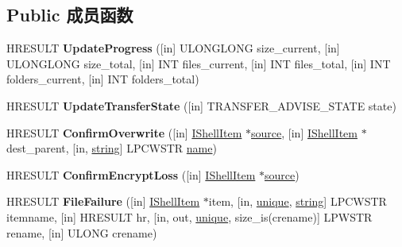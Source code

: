 \subsection*{Public 成员函数}
\begin{DoxyCompactItemize}
\item 
\mbox{\label{interface_i_transfer_advise_sink_a7b44a887f4a382c144d5557bebf167f9}} 
H\+R\+E\+S\+U\+LT {\bfseries Update\+Progress} (\mbox{[}in\mbox{]} U\+L\+O\+N\+G\+L\+O\+NG size\+\_\+current, \mbox{[}in\mbox{]} U\+L\+O\+N\+G\+L\+O\+NG size\+\_\+total, \mbox{[}in\mbox{]} I\+NT files\+\_\+current, \mbox{[}in\mbox{]} I\+NT files\+\_\+total, \mbox{[}in\mbox{]} I\+NT folders\+\_\+current, \mbox{[}in\mbox{]} I\+NT folders\+\_\+total)
\item 
\mbox{\label{interface_i_transfer_advise_sink_acbff1caea7c7a517d2904bdb88e780f1}} 
H\+R\+E\+S\+U\+LT {\bfseries Update\+Transfer\+State} (\mbox{[}in\mbox{]} T\+R\+A\+N\+S\+F\+E\+R\+\_\+\+A\+D\+V\+I\+S\+E\+\_\+\+S\+T\+A\+TE state)
\item 
\mbox{\label{interface_i_transfer_advise_sink_a59cdbda9d779142b460203ce1d7d5977}} 
H\+R\+E\+S\+U\+LT {\bfseries Confirm\+Overwrite} (\mbox{[}in\mbox{]} \hyperlink{interface_i_shell_item}{I\+Shell\+Item} $\ast$\hyperlink{structsource}{source}, \mbox{[}in\mbox{]} \hyperlink{interface_i_shell_item}{I\+Shell\+Item} $\ast$dest\+\_\+parent, \mbox{[}in, \hyperlink{structstring}{string}\mbox{]} L\+P\+C\+W\+S\+TR \hyperlink{structname}{name})
\item 
\mbox{\label{interface_i_transfer_advise_sink_acba7c816f760ac0a1571a80ba5bb5819}} 
H\+R\+E\+S\+U\+LT {\bfseries Confirm\+Encrypt\+Loss} (\mbox{[}in\mbox{]} \hyperlink{interface_i_shell_item}{I\+Shell\+Item} $\ast$\hyperlink{structsource}{source})
\item 
\mbox{\label{interface_i_transfer_advise_sink_ac9d9ae1a3c79cac1429448729d2c377b}} 
H\+R\+E\+S\+U\+LT {\bfseries File\+Failure} (\mbox{[}in\mbox{]} \hyperlink{interface_i_shell_item}{I\+Shell\+Item} $\ast$item, \mbox{[}in, \hyperlink{interfaceunique}{unique}, \hyperlink{structstring}{string}\mbox{]} L\+P\+C\+W\+S\+TR itemname, \mbox{[}in\mbox{]} H\+R\+E\+S\+U\+LT hr, \mbox{[}in, out, \hyperlink{interfaceunique}{unique}, size\+\_\+is(crename)\mbox{]} L\+P\+W\+S\+TR rename, \mbox{[}in\mbox{]} U\+L\+O\+NG crename)

\end{DoxyCompactItemize}
